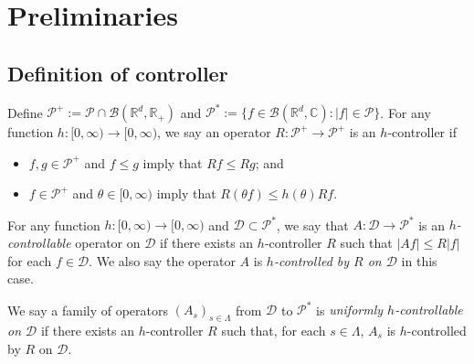 \documentclass[12pt,a4paper]{amsart}
\theoremstyle{plain}
\theoremstyle{definition}
\numberwithin{equation}{section}
\begin{document}

\section{Preliminaries}
\subsection{Definition of controller}
    Define $\mathcal P^+:= \mathcal P \cap \mathcal B(\mathbb R^d, \mathbb R_+)$ and $\mathcal P^*:= \{f\in \mathcal B(\mathbb R^d, \mathbb C): |f|\in \mathcal P\}$.
    For any function $h: [0,\infty) \to [0,\infty)$, we say an operator 
 $R: \mathcal P^+ \to \mathcal P^+$  is an $h$-controller if
\begin{itemize}
\item
   $f, g\in \mathcal P^+$ and $f\leq g$ imply that $Rf \leq Rg$; and
\item
    $f \in \mathcal P^+$ and $\theta \in [0,\infty)$ 
    imply that $ R (\theta f)\leq h(\theta) Rf$.
\end{itemize}

    For any function $h: [0,\infty) \to [0,\infty)$ and $\mathcal D \subset \mathcal P^*$, 
we say that $A : \mathcal D \to \mathcal P^*$ is an \emph{$h$-controllable} operator on $\mathcal D$ if
there exists an $h$-controller $R$ such that $|Af| \leq R|f|$ for each $f\in \mathcal D$.
    We also say the operator $A$ is \emph{$h$-controlled by $R$ on $\mathcal D$} in this case.

   We say a family of operators $(A_s)_{s\in \Lambda}$ from $\mathcal D $ to $\mathcal P^*$
     is \emph{uniformly $h$-controllable on $\mathcal D$} if there exists an $h$-controller $R$ such that, for each $s\in \Lambda$, $A_s$ is $h$-controlled by $R$ on $\mathcal D$.
     
\end{document}

